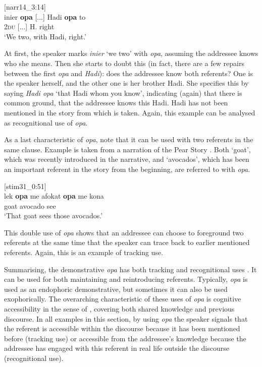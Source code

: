 \documentclass[output=paper,colorlinks,citecolor=brown]{langscibook}
\begin{document}
	\ea \label{exe:hadi} [narr14\_3:14]\\
	\gll inier \textbf{opa} [...] Hadi \textbf{opa} to\\
		\textsc{2du} {\glopa} [...] H. {\glopa} right \\
	\glt 	`We two, with Hadi, right.' 
	\z 


At first, the speaker marks \textit{inier} `we two' with \textit{opa}, assuming the addressee knows who she means. Then she starts to doubt this (in fact, there are a few repairs between the first \textit{opa} and \textit{Hadi}): does the addressee know both referents? One is the speaker herself, and the other one is her brother Hadi. She specifies this by saying \textit{Hadi opa} `that Hadi whom you know', indicating (again) that there is common ground, that the addressee knows this Hadi. Hadi has not been mentioned in the story from which  is taken. Again, this example can be analysed as recognitional use of \textit{opa}.

As a last characteristic of \textit{opa}, note that it can be used with two referents in the same clause. Example  is taken from a narration of the Pear Story \citep{Chafe1975}. Both `goat', which was recently introduced in the narrative, and `avocados', which has been an important referent in the story from the beginning, are referred to with \textit{opa}.

\ea \label{exe:lek} [stim31\_0:51]\\
\gll lek \textbf{opa} me afokat \textbf{opa} me kona\\
goat {\glopa} {\glme} avocado {\glopa} {\glme} see\\
\glt 	`That goat sees those avocados.' 
\z 

This double use of \textit{opa} shows that an addressee can choose to foreground two referents at the same time that the speaker can trace back to earlier mentioned referents. Again, this is an example of tracking use.

Summarising, the demonstrative \textit{opa} has both tracking and recognitional uses \citep{Himmelmann1996}. It can be used for both maintaining and reintroducing referents. Typically, \textit{opa} is used as an endophoric demonstrative, but sometimes it can also be used exophorically. The overarching characteristic of these uses of \textit{opa} is cognitive accessibility in the sense of \cite{Hanks2005}, covering both shared knowledge and previous discourse. In all examples in this section, by using \textit{opa} the speaker signals that the referent is accessible within the discourse because it has been mentioned before (tracking use) or accessible from the addressee's knowledge because the addressee has engaged with this referent in real life outside the discourse (recognitional use).
\end{document}
